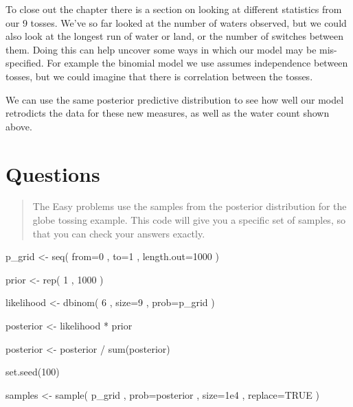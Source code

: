 \documentclass[
]{book}
\newenvironment{Shaded}{\begin{snugshade}}{\end{snugshade}}
\newcommand{\AttributeTok}[1]{\textcolor[rgb]{0.77,0.63,0.00}{#1}}
\newcommand{\ConstantTok}[1]{\textcolor[rgb]{0.00,0.00,0.00}{#1}}
\newcommand{\DecValTok}[1]{\textcolor[rgb]{0.00,0.00,0.81}{#1}}
\newcommand{\FloatTok}[1]{\textcolor[rgb]{0.00,0.00,0.81}{#1}}
\newcommand{\FunctionTok}[1]{\textcolor[rgb]{0.00,0.00,0.00}{#1}}
\newcommand{\NormalTok}[1]{#1}
\newcommand{\OtherTok}[1]{\textcolor[rgb]{0.56,0.35,0.01}{#1}}
\newcommand{\SpecialCharTok}[1]{\textcolor[rgb]{0.00,0.00,0.00}{#1}}
\begin{document}
To close out the chapter there is a section on looking at different statistics from our 9 tosses. We've so far looked at the number of waters observed, but we could also look at the longest run of water or land, or the number of switches between them. Doing this can help uncover some ways in which our model may be mis-specified. For example the binomial model we use assumes independence between tosses, but we could imagine that there is correlation between the tosses.

We can use the same posterior predictive distribution to see how well our model retrodicts the data for these new measures, as well as the water count shown above.

\hypertarget{questions-2}{%
\section{Questions}\label{questions-2}}

\begin{quote}
The Easy problems use the samples from the posterior distribution for the globe tossing example. This code will give you a specific set of samples, so that you can check your answers exactly.
\end{quote}

\begin{Shaded}
\begin{Highlighting}[]
\NormalTok{p\_grid }\OtherTok{\textless{}{-}} \FunctionTok{seq}\NormalTok{( }\AttributeTok{from=}\DecValTok{0}\NormalTok{ , }\AttributeTok{to=}\DecValTok{1}\NormalTok{ , }\AttributeTok{length.out=}\DecValTok{1000}\NormalTok{ ) }

\NormalTok{prior }\OtherTok{\textless{}{-}} \FunctionTok{rep}\NormalTok{( }\DecValTok{1}\NormalTok{ , }\DecValTok{1000}\NormalTok{ ) }

\NormalTok{likelihood }\OtherTok{\textless{}{-}} \FunctionTok{dbinom}\NormalTok{( }\DecValTok{6}\NormalTok{ , }\AttributeTok{size=}\DecValTok{9}\NormalTok{ , }\AttributeTok{prob=}\NormalTok{p\_grid ) }

\NormalTok{posterior }\OtherTok{\textless{}{-}}\NormalTok{ likelihood }\SpecialCharTok{*}\NormalTok{ prior}

\NormalTok{posterior }\OtherTok{\textless{}{-}}\NormalTok{ posterior }\SpecialCharTok{/} \FunctionTok{sum}\NormalTok{(posterior)}

\FunctionTok{set.seed}\NormalTok{(}\DecValTok{100}\NormalTok{) }

\NormalTok{samples }\OtherTok{\textless{}{-}} \FunctionTok{sample}\NormalTok{( p\_grid , }\AttributeTok{prob=}\NormalTok{posterior , }\AttributeTok{size=}\FloatTok{1e4}\NormalTok{ , }\AttributeTok{replace=}\ConstantTok{TRUE}\NormalTok{ )}
\end{Highlighting}
\end{Shaded}
\end{document}
